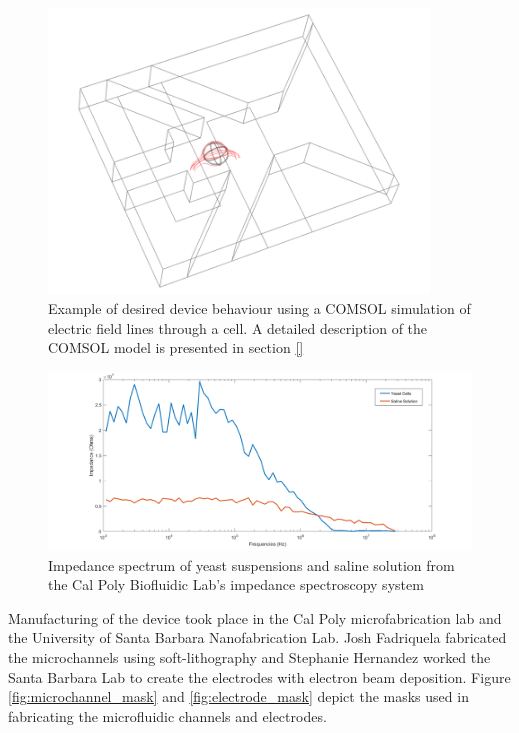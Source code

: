 \begin{figure}[h]
    \centering
    \includegraphics[width=0.9\textwidth]{images/josh_steph_sim.png}
    \caption[Example of desired device behaviour using a COMSOL simulation of electric field lines through a cell.]{Example of desired device behaviour using a COMSOL simulation of electric field lines through a cell. A detailed description of the COMSOL model is presented in section \ref{}}
    \label{fig:josh-steph_sim}
\end{figure}


\begin{figure}[h]
    \centering
    \includegraphics[width=\textwidth]{images/stephanie_impedance_data.png}
    \caption[Impedance spectrum of yeast suspensions and saline solution from the Cal Poly Biofluidic Lab's impedance spectroscopy system]{Impedance spectrum of yeast suspensions and saline solution from the Cal Poly Biofluidic Lab's impedance spectroscopy system \cite{hernandez_single_2009-1}}
    \label{fig:stephanie_impedance_data}
\end{figure}

\par Manufacturing of the device took place in the Cal Poly microfabrication lab and the University of Santa Barbara Nanofabrication Lab. Josh Fadriquela fabricated the microchannels using soft-lithography and Stephanie Hernandez worked the Santa Barbara Lab to create the electrodes with electron beam deposition. Figure \ref{fig:microchannel_mask} and \ref{fig:electrode_mask} depict the masks used in fabricating the microfluidic channels and electrodes.

